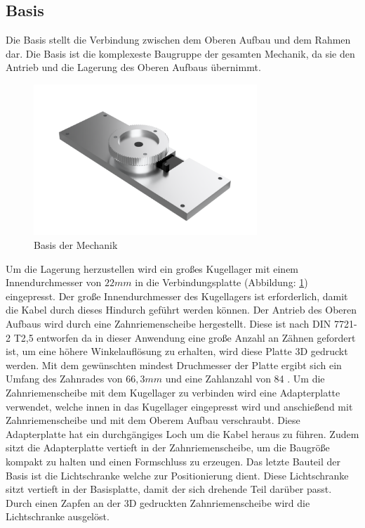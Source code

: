 \subsection{Basis}
Die Basis stellt die Verbindung zwischen dem Oberen Aufbau und dem Rahmen dar. Die Basis ist die komplexeste Baugruppe der gesamten Mechanik, da sie den Antrieb und die Lagerung des Oberen Aufbaus übernimmt. 
\begin{figure}[H]
	\centering
	\includegraphics[width=0.75\textwidth]{images/Mechanik/Basis}
	\caption{Basis der Mechanik}
	\label{basis}
\end{figure}
Um die Lagerung herzustellen wird ein großes Kugellager mit einem Innendurchmesser von $22mm$ in die Verbindungsplatte (Abbildung: \ref{basis}) eingepresst. Der große Innendurchmesser des Kugellagers ist erforderlich, damit die Kabel durch dieses Hindurch geführt werden können. Der Antrieb des Oberen Aufbaus wird durch eine Zahnriemenscheibe hergestellt. Diese ist nach DIN 7721-2 T2,5 \cite{Tabellenbuch} entworfen da in dieser Anwendung eine große Anzahl an Zähnen gefordert ist, um eine höhere Winkelauflösung zu erhalten, wird diese Platte 3D gedruckt werden. Mit dem gewünschten mindest Druchmesser der Platte ergibt sich ein Umfang des Zahnrades von $66,3mm$ und eine Zahlanzahl von 84 \cite{Tabellenbuch}. Um die Zahnriemenscheibe mit dem Kugellager zu verbinden wird eine Adapterplatte verwendet, welche innen in das Kugellager eingepresst wird und anschießend mit Zahnriemenscheibe und mit dem Oberem Aufbau verschraubt. Diese Adapterplatte hat ein durchgängiges Loch um die Kabel heraus zu führen. Zudem sitzt die Adapterplatte vertieft in der Zahnriemenscheibe, um die Baugröße kompakt zu halten und einen Formschluss zu erzeugen. Das letzte Bauteil der Basis ist die Lichtschranke welche zur Positionierung dient. Diese Lichtschranke sitzt vertieft in der Basisplatte, damit der sich drehende Teil darüber passt. Durch einen Zapfen an der 3D gedruckten Zahnriemenscheibe wird die Lichtschranke ausgelöst. 
